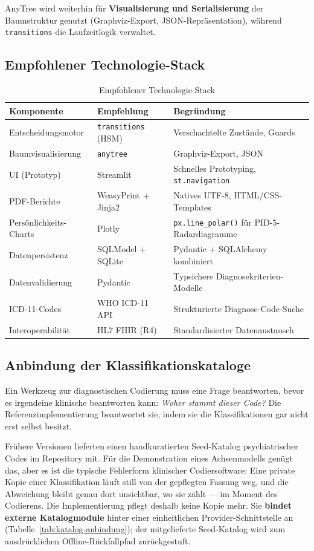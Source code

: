 \documentclass[11pt,a4paper]{article}
\begin{document}
AnyTree wird weiterhin f\"ur \textbf{Visualisierung und Serialisierung} der Baumstruktur genutzt (Graphviz-Export, JSON-Repr\"asentation), w\"ahrend \texttt{transitions} die Laufzeitlogik verwaltet.

\subsection{Empfohlener Technologie-Stack}

\begin{table}[H]
\centering
\caption{Empfohlener Technologie-Stack}
\label{tab:techstack}
\begin{tabularx}{\textwidth}{lXl}
\toprule
\textbf{Komponente} & \textbf{Empfehlung} & \textbf{Begr\"undung} \\
\midrule
Entscheidungsmotor & \texttt{transitions} (HSM) & Verschachtelte Zust\"ande, Guards \\
Baumvisualisierung & \texttt{anytree} & Graphviz-Export, JSON \\
UI (Prototyp) & Streamlit & Schnelles Prototyping, \texttt{st.navigation} \\
PDF-Berichte & WeasyPrint + Jinja2 & Natives UTF-8, HTML/CSS-Templates \\
Pers\"onlichkeits-Charts & Plotly & \texttt{px.line\_polar()} f\"ur PID-5-Radardiagramme \\
Datenpersistenz & SQLModel + SQLite & Pydantic + SQLAlchemy kombiniert \\
Datenvalidierung & Pydantic & Typsichere Diagnosekriterien-Modelle \\
ICD-11-Codes & WHO ICD-11 API & Strukturierte Diagnose-Code-Suche \\
Interoperabilit\"at & HL7 FHIR (R4) & Standardisierter Datenaustausch \\
\bottomrule
\end{tabularx}
\end{table}

\subsection{Anbindung der Klassifikationskataloge}
\label{sec:katalog-anbindung}

Ein Werkzeug zur diagnostischen Codierung muss eine Frage beantworten, bevor es irgendeine klinische beantworten kann: \emph{Woher stammt dieser Code?} Die Referenzimplementierung beantwortet sie, indem sie die Klassifikationen gar nicht erst selbst besitzt.

Frühere Versionen lieferten einen handkuratierten Seed-Katalog psychiatrischer Codes im Repository mit. Für die Demonstration eines Achsenmodells genügt das, aber es ist die typische Fehlerform klinischer Codiersoftware: Eine private Kopie einer Klassifikation läuft still von der gepflegten Fassung weg, und die Abweichung bleibt genau dort unsichtbar, wo sie zählt --- im Moment des Codierens. Die Implementierung pflegt deshalb keine Kopie mehr. Sie \textbf{bindet externe Katalogmodule} hinter einer einheitlichen Provider-Schnittstelle an (Tabelle~\ref{tab:katalog-anbindung}); der mitgelieferte Seed-Katalog wird zum ausdrücklichen Offline-Rückfallpfad zurückgestuft.
\end{document}
